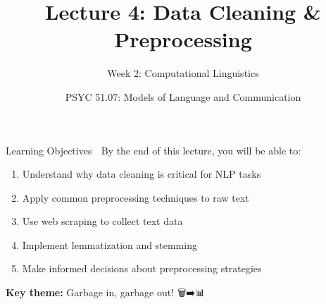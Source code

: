 \documentclass[aspectratio=169]{beamer}
\title{Lecture 4: Data Cleaning \& Preprocessing}
\subtitle{Week 2: Computational Linguistics}
\author{PSYC 51.07: Models of Language and Communication}
\date{}
\begin{document}
\begin{frame}
    \titlepage
\end{frame}

\begin{frame}{Learning Objectives 🎯}
    By the end of this lecture, you will be able to:

    \begin{enumerate}\setlength{\itemsep}{0pt}
        \item Understand why data cleaning is critical for NLP tasks
        \item Apply common preprocessing techniques to raw text
        \item Use web scraping to collect text data
        \item Implement lemmatization and stemming
        \item Make informed decisions about preprocessing strategies
    \end{enumerate}

    \vspace{1em}
    \textbf{Key theme:} Garbage in, garbage out! 🗑️➡️📊
\end{frame}
\end{document}
